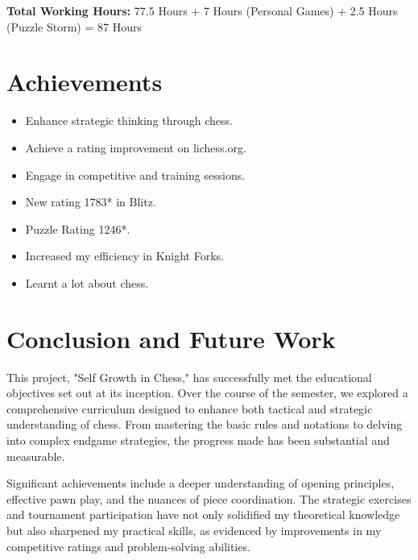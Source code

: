 \documentclass[a4paper,11pt]{article}
\begin{document}
\vspace{10pt}
\noindent \textbf{Total Working Hours:} 77.5 Hours + 7 Hours (Personal Games) + 2.5 Hours (Puzzle Storm) = 87 Hours

\section{Achievements}
\begin{itemize}
    \item Enhance strategic thinking through chess.
    \item Achieve a rating improvement on lichess.org.
    \item Engage in competitive and training sessions.
    \item New rating 1783* in Blitz.
    \item Puzzle Rating 1246*.
    \item Increased my efficiency in Knight Forks.
    \item Learnt a lot about chess.
\end{itemize}

\section{Conclusion and Future Work}

This project, "Self Growth in Chess," has successfully met the educational objectives set out at its inception. Over the course of the semester, we explored a comprehensive curriculum designed to enhance both tactical and strategic understanding of chess. From mastering the basic rules and notations to delving into complex endgame strategies, the progress made has been substantial and measurable.

Significant achievements include a deeper understanding of opening principles, effective pawn play, and the nuances of piece coordination. The strategic exercises and tournament participation have not only solidified my theoretical knowledge but also sharpened my practical skills, as evidenced by improvements in my competitive ratings and problem-solving abilities.
\end{document}
